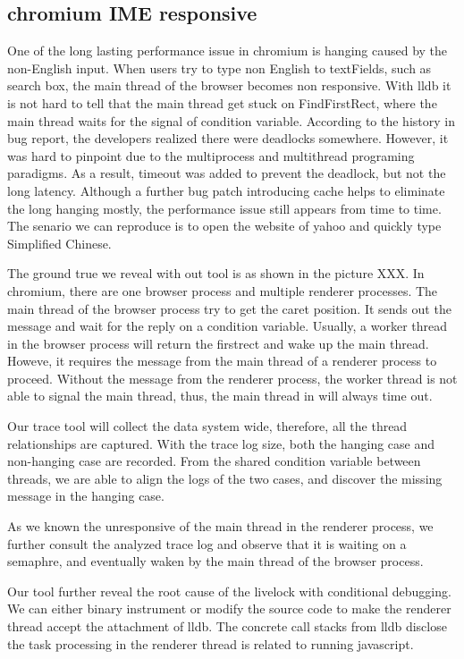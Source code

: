 \subsection{chromium IME responsive}
One of the long lasting performance issue in chromium is hanging caused by the non-English input.
When users try to type non English to textFields, such as search box,
the main thread of the browser becomes non responsive.
With lldb it is not hard to tell that the main thread get stuck on FindFirstRect,
where the main thread waits for the signal of condition variable.
According to the history in bug report, the developers realized there were deadlocks somewhere.
However, it was hard to pinpoint due to the multiprocess and multithread programing paradigms.
As a result, timeout was added to prevent the deadlock, but not the long latency.
Although a further bug patch introducing cache helps to eliminate the long hanging mostly, 
the performance issue still appears from time to time.
The senario we can reproduce is to open the website of yahoo and quickly type Simplified Chinese.

The ground true we reveal with out tool is as shown in the picture XXX.
In chromium, there are one browser process and multiple renderer processes.
The main thread of the browser process try to get the caret position.
It sends out the message and wait for the reply on a condition variable.
Usually, a worker thread in the browser process will return the firstrect and wake up the main thread.
Howeve, it requires the message from the main thread of a renderer process to proceed.
Without the message from the renderer process, the worker thread is not able to signal the main thread,
thus, the main thread in will always time out.

Our trace tool will collect the data system wide, therefore, all the thread relationships are captured.
With the trace log size, both the hanging case and non-hanging case are recorded.
From the shared condition variable between threads, we are able to align the logs of the two cases,
and discover the missing message in the hanging case.

As we known the unresponsive of the main thread in the renderer process,
we further consult the analyzed trace log and observe that it is waiting on a semaphre,
and eventually waken by the main thread of the browser process.

Our tool further reveal the root cause of the livelock with conditional debugging.
We can either binary instrument or modify the source code to make the renderer thread accept the attachment of lldb.
The concrete call stacks from lldb disclose the task processing in the renderer thread is related to running javascript.
